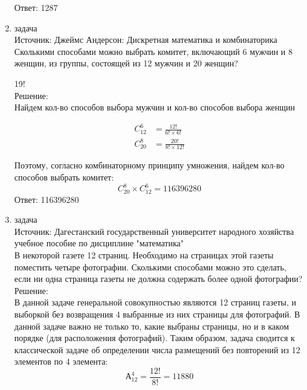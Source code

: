 \documentclass[a4paper,14pt]{extreport} %
\begin{document}
\begin{center}
\begin{enumerate}
						 Ответ: 1287
						 
						  \item {\large задача  }\\
						 Источник: Джеймс Андерсон: Дискретная математика и комбинаторика\\
						 \vspace{15pt}
						 Сколькими способами можно выбрать комитет, включающий 6
						 мужчин и 8 женщин, из группы, состоящей из 12 мужчин и 20 женщин?
						 
						 19!\\
						 \vspace{15pt}
						 Решение:\\
						 Найдем кол-во способов выбора мужчин и кол-во способов выбора женщин
						 
						 \begin{align}
						 	C_{12}^6 &= \frac{12!}{6!\times6!}\\
						 	C_{20}^8 &= \frac{20!}{8!\times12!}  
						 \end{align}
						 
						 Поэтому, согласно комбинаторному принципу умножения, найдем кол-во способов выбрать комитет:
						 \begin{equation}
						 	C_{20}^8 \times C_{12}^6 = 116396280
						 \end{equation}
						 Ответ: 116396280
						 
						  \item {\large задача  }\\
						 Источник: Дагестанский государственный университет народного хозяйства учебное пособие по дисциплине "математика"\\
						 \vspace{15pt}
						 В некоторой газете 12 страниц. Необходимо на страницах этой газеты поместить четыре фотографии. Сколькими способами можно это сделать, если ни одна страница газеты не должна содержать более одной фотографии? 
						 \\
						 \vspace{15pt}
						 Решение:\\
						 В данной задаче генеральной совокупностью являются 12 страниц газеты, и выборкой без возвращения 4 выбранные из них страницы для фотографий. В данной задаче важно не только то, какие выбраны страницы, но и в каком порядке (для расположения фотографий). Таким образом, задача сводится к классической задаче об определении числа размещений без повторений из 12 элементов по 4 элемента: 
						 \begin{equation}
						 	А_{12}^4 = \frac{12!}{8!} = 11880
						 \end{equation}
						 

\end{enumerate}
\end{center}
\end{document}
